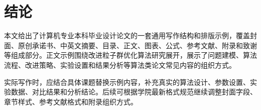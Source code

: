 \chapter{结论}

本文给出了计算机专业本科毕业设计论文的一套通用写作结构和排版示例，覆盖封面、原创承诺书、中英文摘要、目录、正文、图表、公式、参考文献、附录和致谢等组成部分。正文示例围绕改进粒子群优化算法研究展开，展示了问题建模、算法流程、改进策略、实验设置和结果分析等算法类论文常见内容的组织方式。

实际写作时，应结合具体课题替换示例内容，补充真实的算法设计、参数设置、实验数据、对比结果和分析结论。后续可根据学院最新格式规范继续调整封面字段、章节样式、参考文献格式和附录组织方式。

